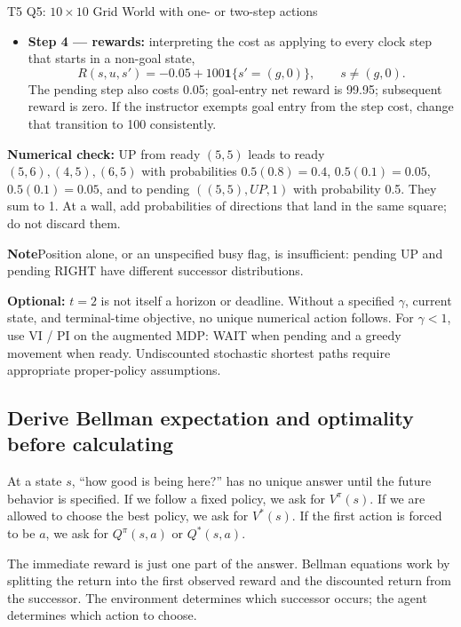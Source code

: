 \documentclass[10pt,a4paper]{article}
\newcommand{\pit}{\par\smallskip\textbf{\color{warn}Note\quad}}
\newcommand{\ind}{\mathbf 1}
\begin{document}
\begin{question}{T5 Q5: $10\times10$ Grid World with one- or two-step actions}
\begin{itemize}
\[\begin{aligned}
P((x,a,1)\mid(x,0),a)&=0.5,\\
P((x',0)\mid(x,a,1),WAIT)&=T(x'\mid x,a).
\end{aligned}
\]
\item \textbf{Step 4 --- rewards:} interpreting the cost as applying to every clock step that starts in a non-goal state,
\[
R(s,u,s')=-0.05+100\ind\{s'=(g,0)\},\qquad s\ne(g,0).
\]
The pending step also costs 0.05; goal-entry net reward is 99.95; subsequent reward is zero. If the instructor exempts goal entry from the step cost, change that transition to 100 consistently.
\end{itemize}
\textbf{Numerical check:} UP from ready $(5,5)$ leads to ready $(5,6),(4,5),(6,5)$ with probabilities $0.5(0.8)=0.4$, $0.5(0.1)=0.05$, $0.5(0.1)=0.05$, and to pending $((5,5),UP,1)$ with probability 0.5. They sum to 1. At a wall, add probabilities of directions that land in the same square; do not discard them.
\pit Position alone, or an unspecified busy flag, is insufficient: pending UP and pending RIGHT have different successor distributions.

\textbf{Optional:} $t=2$ is not itself a horizon or deadline. Without a specified $\gamma$, current state, and terminal-time objective, no unique numerical action follows. For $\gamma<1$, use VI / PI on the augmented MDP: WAIT when pending and a greedy movement when ready. Undiscounted stochastic shortest paths require appropriate proper-policy assumptions.
\end{question}

\subsection{Derive Bellman expectation and optimality before calculating}
\begin{idea}
At a state $s$, ``how good is being here?'' has no unique answer until the future behavior is specified. If we follow a fixed policy, we ask for $V^\pi(s)$. If we are allowed to choose the best policy, we ask for $V^*(s)$. If the first action is forced to be $a$, we ask for $Q^\pi(s,a)$ or $Q^*(s,a)$.

The immediate reward is just one part of the answer. Bellman equations work by splitting the return into the first observed reward and the discounted return from the successor. The environment determines which successor occurs; the agent determines which action to choose.
\end{idea}
\end{document}
